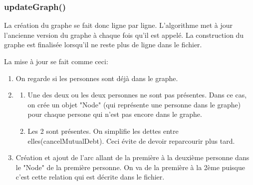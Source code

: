 \documentclass[a4paper]{article}
\begin{document}
\subsubsection{updateGraph()}
La création du graphe se fait donc ligne par ligne. L'algorithme met à jour l'ancienne version du graphe à chaque fois qu'il est appelé. La construction du graphe est finalisée lorsqu'il ne reste plus de ligne dans le fichier.

La mise à jour se fait comme ceci:
\begin{enumerate}
\item On regarde si les personnes sont déjà dans le graphe.
\item \begin{enumerate}
\item Une des deux ou les deux personnes ne sont pas présentes. Dans ce cas, on crée un objet "Node" (qui représente une personne dans le graphe) pour chaque persone qui n'est pas encore dans le graphe.
\item Les 2 sont présentes. On simplifie les dettes entre elles(cancelMutualDebt). Ceci évite de devoir reparcourir plus tard. 
\end{enumerate}
\item Création et ajout de l'arc allant de la première à la deuxième personne dans le "Node" de la première personne. On va de la première à la 2ème puisque c'est cette relation qui est décrite dans le fichier.
\end{enumerate}
\end{document}
